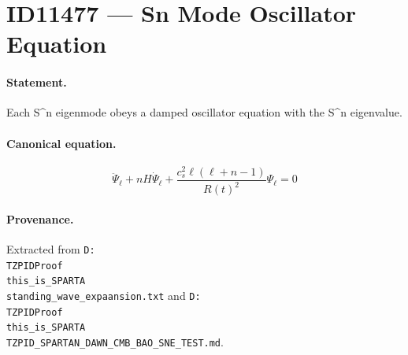 \section*{ID11477 --- Sn Mode Oscillator Equation}

\paragraph{Statement.}
Each S^n eigenmode obeys a damped oscillator equation with the S^n eigenvalue.

\paragraph{Canonical equation.}
\[
\ddot\Psi_\ell+nH\dot\Psi_\ell+\frac{c_s^2\ell(\ell+n-1)}{R(t)^2}\Psi_\ell=0
\]

\paragraph{Provenance.}
Extracted from \texttt{D:\\TZPIDProof\\this\_is\_SPARTA\\standing\_wave\_expaansion.txt} and \texttt{D:\\TZPIDProof\\this\_is\_SPARTA\\TZPID\_SPARTAN\_DAWN\_CMB\_BAO\_SNE\_TEST.md}.
